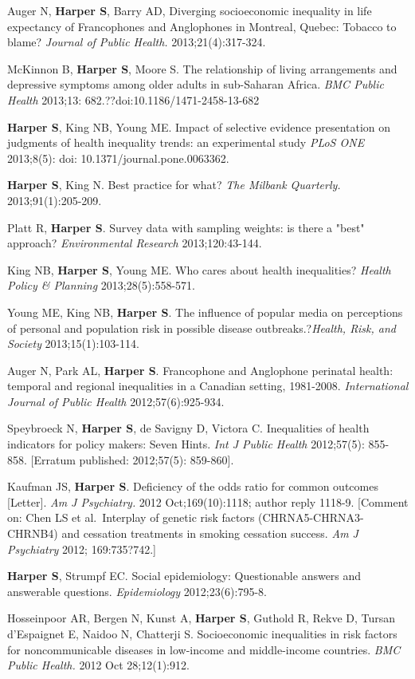 \documentclass[
  letterpaper,
  DIV=11,
  numbers=noendperiod]{scrartcl}
\begin{document}
Auger N, \textbf{Harper S}, Barry AD, Diverging socioeconomic inequality
in life expectancy of Francophones and Anglophones in Montreal, Quebec:
Tobacco to blame? \emph{Journal of Public Health.} 2013;21(4):317-324.

McKinnon B, \textbf{Harper S}, Moore S. The relationship of living
arrangements and depressive symptoms among older adults in sub-Saharan
Africa. \emph{BMC Public Health} 2013;13:
682.??doi:10.1186/1471-2458-13-682

\textbf{Harper S}, King NB, Young ME. Impact of selective evidence
presentation on judgments of health inequality trends: an experimental
study \emph{PLoS ONE} 2013;8(5): doi: 10.1371/journal.pone.0063362.

\textbf{Harper S}, King N. Best practice for what? \emph{The Milbank
Quarterly.} 2013;91(1):205-209.

Platt R, \textbf{Harper S}. Survey data with sampling weights: is there
a "best" approach? \emph{Environmental Research} 2013;120:43-144.

King NB, \textbf{Harper S}, Young ME. Who cares about health
inequalities? \emph{Health Policy \& Planning} 2013;28(5):558-571.

Young ME, King NB, \textbf{Harper S}. The influence of popular media on
perceptions of personal and population risk in possible disease
outbreaks.?\emph{Health, Risk, and Society} 2013;15(1):103-114.

Auger N, Park AL, \textbf{Harper S}. Francophone and Anglophone
perinatal health: temporal and regional inequalities in a Canadian
setting, 1981-2008. \emph{International Journal of Public Health}
2012;57(6):925-934.

Speybroeck N, \textbf{Harper S}, de Savigny D, Victora C. Inequalities
of health indicators for policy makers: Seven Hints. \emph{Int J Public
Health} 2012;57(5): 855-858. {[}Erratum published: 2012;57(5):
859-860{]}.

Kaufman JS, \textbf{Harper S}. Deficiency of the odds ratio for common
outcomes {[}Letter{]}. \emph{Am J Psychiatry.} 2012 Oct;169(10):1118;
author reply 1118-9. {[}Comment on: Chen LS et al.~Interplay of genetic
risk factors (CHRNA5-CHRNA3-CHRNB4) and cessation treatments in smoking
cessation success. \emph{Am J Psychiatry} 2012; 169:735?742.{]}

\textbf{Harper S}, Strumpf EC. Social epidemiology: Questionable answers
and answerable questions. \emph{Epidemiology} 2012;23(6):795-8.

Hosseinpoor AR, Bergen N, Kunst A, \textbf{Harper S}, Guthold R, Rekve
D, Tursan d'Espaignet E, Naidoo N, Chatterji S. Socioeconomic
inequalities in risk factors for noncommunicable diseases in low-income
and middle-income countries. \emph{BMC Public Health.} 2012 Oct
28;12(1):912.
\end{document}
